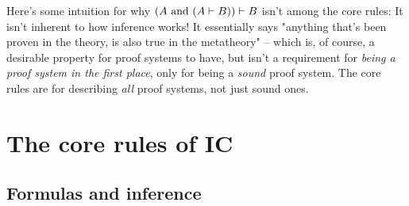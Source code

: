 \documentclass{article}
\begin{document}
  Here's some intuition for why $(A\ \mathrm{and}\ (A \vdash B)) \vdash B$ isn't among the core rules: It isn't inherent to how inference works! It essentially says "anything that's been proven in the theory, is also true in the metatheory" – which is, of course, a desirable property for proof systems to have, but isn't a requirement for \emph{being a proof system in the first place}, only for being a \emph{sound} proof system. The core rules are for describing \emph{all} proof systems, not just sound ones.
  
  \section{The core rules of IC}
 
  \subsection{Formulas and inference}
  
  \newcommand{\id}{\name{id}}
  \newcommand{\const}{\name{const}}
  \newcommand{\fuse}{\name{fuse}}
  
  \newcommand{\atomemptyset}{\name{empty\_set}}
  \newcommand{\atomsingleton}{\name{singleton}}
  \newcommand{\atomin}{\name{in}}
  \newcommand{\atomunion}{\name{union}}
  \newcommand{\atomconcludes}{\name{concludes}}
  \newcommand{\atomall}{\name{all}}
  \newcommand{\atominfrule}{\name{rule}}
  \newcommand{\atomimplies}{\name{implies}}
  \renewcommand{\emptyset}{\varnothing}
  \newcommand{\singleton}[1]{\{#1\}}
  \newcommand{\union}{\cup}
  
  \newcommand{\and}{\wedge}
  \newcommand{\all}{\bigcup}
  \newcommand{\atomequals}{\name{equals}}
  \newcommand{\equals}{\equiv}
  \newcommand{\concludes}{\leadsto}
  \newcommand{\infrule}{\vdash}
  
  
  
\end{document}
